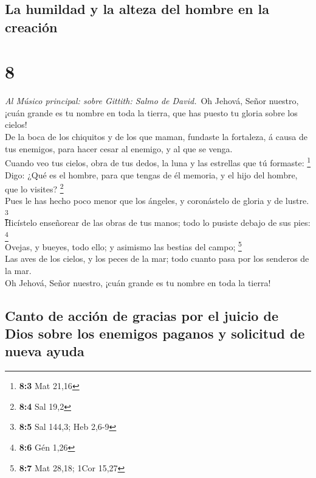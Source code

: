 \hypertarget{la-humildad-y-la-alteza-del-hombre-en-la-creaciuxf3n}{%
\subsection{La humildad y la alteza del hombre en la
creación}\label{la-humildad-y-la-alteza-del-hombre-en-la-creaciuxf3n}}

\hypertarget{section-7}{%
\section{8}\label{section-7}}

 \emph{Al Músico principal: sobre Gittith: Salmo de
David.}~Oh Jehová, Señor nuestro, ¡cuán grande es tu nombre en toda la
tierra, que has puesto tu gloria sobre los cielos!\\
 De la boca de los chiquitos y de los que maman, fundaste la
fortaleza, á causa de tus enemigos, para hacer cesar al enemigo, y al
que se venga.\\
 Cuando veo tus cielos, obra de tus dedos, la luna y las
estrellas que tú formaste: \footnote{\textbf{8:3} Mat 21,16}\\
 Digo: ¿Qué es el hombre, para que tengas de él memoria, y
el hijo del hombre, que lo visites? \footnote{\textbf{8:4} Sal 19,2}\\
 Pues le has hecho poco menor que los ángeles, y coronástelo
de gloria y de lustre. \footnote{\textbf{8:5} Sal 144,3; Heb 2,6-9}\\
 Hicístelo enseñorear de las obras de tus manos; todo lo
pusiste debajo de sus pies: \footnote{\textbf{8:6} Gén 1,26}\\
 Ovejas, y bueyes, todo ello; y asimismo las bestias del
campo; \footnote{\textbf{8:7} Mat 28,18; 1Cor 15,27}\\
 Las aves de los cielos, y los peces de la mar; todo cuanto
pasa por los senderos de la mar.\\
 Oh Jehová, Señor nuestro, ¡cuán grande es tu nombre en toda
la tierra!

\hypertarget{canto-de-acciuxf3n-de-gracias-por-el-juicio-de-dios-sobre-los-enemigos-paganos-y-solicitud-de-nueva-ayuda}{%
\subsection{Canto de acción de gracias por el juicio de Dios sobre los
enemigos paganos y solicitud de nueva
ayuda}\label{canto-de-acciuxf3n-de-gracias-por-el-juicio-de-dios-sobre-los-enemigos-paganos-y-solicitud-de-nueva-ayuda}}

